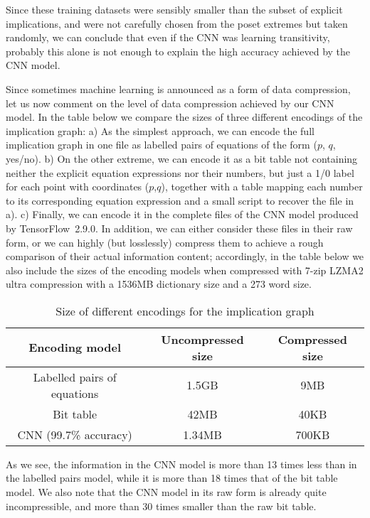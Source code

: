 \noindent Since these training datasets were sensibly smaller than the subset of explicit implications, and were not carefully chosen from the poset extremes but taken randomly, we can conclude that even if the CNN was learning transitivity, probably this alone is not enough to explain the high accuracy achieved by the CNN model.

\smallskip

Since sometimes machine learning is announced as a form of data compression, let us now comment on the level of data compression achieved by our CNN model. In the table below we compare the sizes of three different encodings of the implication graph: a) As the simplest approach, we can encode the full implication graph in one file as labelled pairs of equations of the form ($p$, $q$, yes/no). b) On the other extreme, we can encode it as a bit table not containing neither the explicit equation expressions nor their numbers, but just a 1/0 label for each point with coordinates ($p$,$q$), together with a table mapping each number to its corresponding equation expression and a small script to recover the file in a). c) Finally, we can encode it in the complete files of the CNN model produced by TensorFlow 2.9.0. In addition, we can either consider these files in their raw form, or we can highly (but losslessly) compress them to achieve a rough comparison of their actual information content; accordingly, in the table below we also include the sizes of the encoding models when compressed with 7-zip LZMA2 ultra compression with a 1536MB dictionary size and a 273 word size.

\begin{table}[h]
\centering
\begin{tabular}{|c|c|c|}
  \hline
  \textbf{Encoding model} & \textbf{Uncompressed size} & \textbf{Compressed size} \\\hline\hline
  Labelled pairs of equations & 1.5GB & 9MB \\\hline
  Bit table & 42MB & 40KB \\\hline
  CNN (99.7\% accuracy) & 1.34MB & 700KB \\
  \hline
\end{tabular}
\caption{Size of different encodings for the implication graph}
\end{table}

\smallskip

\noindent As we see, the information in the CNN model is more than 13 times less than in the labelled pairs model, while it is more than 18 times that of the bit table model. We also note that the CNN model in its raw form is already quite incompressible, and more than 30 times smaller than the raw bit table.

